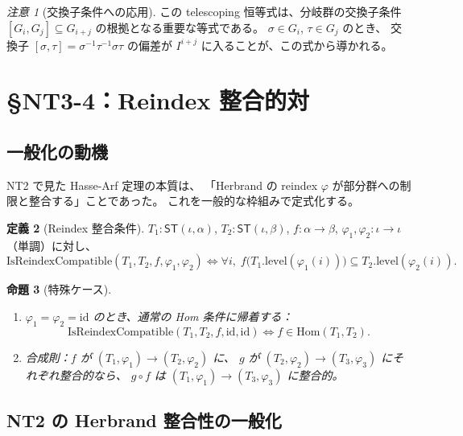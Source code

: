 \documentclass[a4paper,11pt]{ltjsarticle}
\theoremstyle{definition}
\newtheorem{definition}{定義}[section]
\theoremstyle{plain}
\newtheorem{proposition}[definition]{命題}
\theoremstyle{remark}
\newtheorem{remark}[definition]{注意}
\newcommand{\ST}{\mathsf{ST}}
\newcommand{\Hom}{\mathrm{Hom}}
\begin{document}
\begin{remark}[交換子条件への応用]
この telescoping 恒等式は、分岐群の交換子条件
$[G_i, G_j] \subseteq G_{i+j}$ の根拠となる重要な等式である。
$\sigma \in G_i$, $\tau \in G_j$ のとき、
交換子 $[\sigma, \tau] = \sigma^{-1}\tau^{-1}\sigma\tau$ の偏差が
$I^{i+j}$ に入ることが、この式から導かれる。
\end{remark}

\section{\S NT3-4：Reindex 整合的対}

\subsection{一般化の動機}

NT2 で見た Hasse-Arf 定理の本質は、
「Herbrand の reindex \(\varphi\) が部分群への制限と整合する」ことであった。
これを一般的な枠組みで定式化する。

\begin{definition}[Reindex 整合条件]
$T_1 : \ST(\iota, \alpha)$, $T_2 : \ST(\iota, \beta)$,
$f : \alpha \to \beta$,
$\varphi_1, \varphi_2 : \iota \to \iota$（単調）に対し、
\[
\mathrm{IsReindexCompatible}(T_1, T_2, f, \varphi_1, \varphi_2)
\iff \forall i,\; f\bigl(T_1.\mathrm{level}(\varphi_1(i))\bigr)
   \subseteq T_2.\mathrm{level}(\varphi_2(i)).
\]
\end{definition}

\begin{proposition}[特殊ケース]
\leavevmode
\begin{enumerate}
  \item $\varphi_1 = \varphi_2 = \mathrm{id}$ のとき、通常の Hom 条件に帰着する：
        \[
        \mathrm{IsReindexCompatible}(T_1, T_2, f, \mathrm{id}, \mathrm{id})
        \iff f \in \Hom(T_1, T_2).
        \]
  \item 合成則：$f$ が $(T_1, \varphi_1) \to (T_2, \varphi_2)$ に、
        $g$ が $(T_2, \varphi_2) \to (T_3, \varphi_3)$ にそれぞれ整合的なら、
        $g \circ f$ は $(T_1, \varphi_1) \to (T_3, \varphi_3)$ に整合的。
\end{enumerate}
\end{proposition}

\subsection{NT2 の Herbrand 整合性の一般化}
\end{document}
